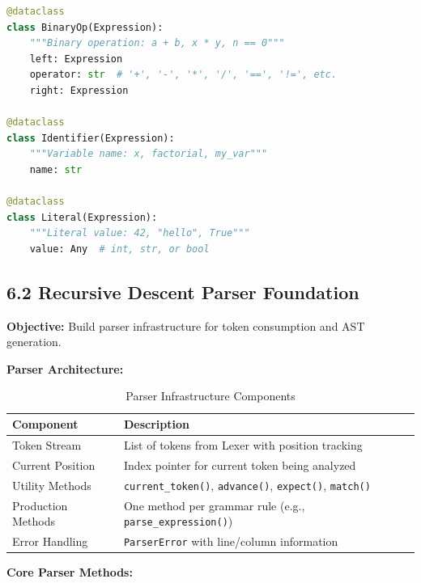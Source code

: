 \documentclass[a4paper,11pt]{article}
\begin{document}
\begin{lstlisting}[language=Python, caption=Expression Node Examples]
@dataclass
class BinaryOp(Expression):
    """Binary operation: a + b, x * y, n == 0"""
    left: Expression
    operator: str  # '+', '-', '*', '/', '==', '!=', etc.
    right: Expression

@dataclass
class Identifier(Expression):
    """Variable name: x, factorial, my_var"""
    name: str

@dataclass
class Literal(Expression):
    """Literal value: 42, "hello", True"""
    value: Any  # int, str, or bool
\end{lstlisting}

\subsection{6.2 Recursive Descent Parser Foundation}

\textbf{Objective:} Build parser infrastructure for token consumption and AST generation.

\textbf{Parser Architecture:}

\begin{table}[h]
\centering
\begin{tabularx}{\textwidth}{|l|X|}
\hline
\rowcolor{blue!10}
\textbf{Component} & \textbf{Description} \\
\hline
Token Stream & List of tokens from Lexer with position tracking \\
\hline
Current Position & Index pointer for current token being analyzed \\
\hline
Utility Methods & \texttt{current\_token()}, \texttt{advance()}, \texttt{expect()}, \texttt{match()} \\
\hline
Production Methods & One method per grammar rule (e.g., \texttt{parse\_expression()}) \\
\hline
Error Handling & \texttt{ParserError} with line/column information \\
\hline
\end{tabularx}
\caption{Parser Infrastructure Components}
\end{table}

\textbf{Core Parser Methods:}
\end{document}

